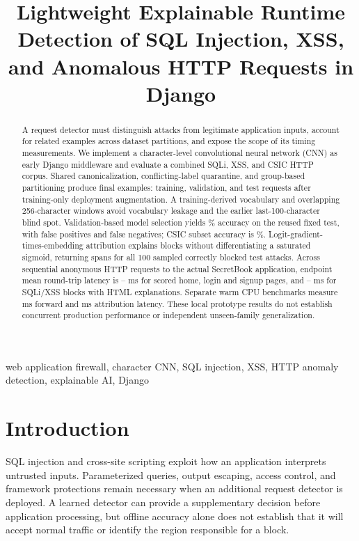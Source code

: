 \documentclass[conference]{IEEEtran}
\title{Lightweight Explainable Runtime Detection of SQL Injection, XSS, and Anomalous HTTP Requests in Django}
\author{\IEEEauthorblockN{Divyanth Dayasankar.P, Rohit Michael Raj}
\IEEEauthorblockA{\textit{Department of Computer Science}\\\textit{VIT Chennai}\\Chennai, India}}
\begin{document}
\maketitle
\begin{abstract}
A request detector must distinguish attacks from legitimate application inputs, account for related examples across dataset partitions, and expose the scope of its timing measurements. We implement a character-level convolutional neural network (CNN) as early Django middleware and evaluate a combined SQLi, XSS, and CSIC HTTP corpus. Shared canonicalization, conflicting-label quarantine, and group-based partitioning produce \FinalN{} final examples: \TrainN{} training, \ValN{} validation, and \TestN{} test requests after training-only deployment augmentation. A training-derived vocabulary and overlapping 256-character windows avoid vocabulary leakage and the earlier last-100-character blind spot. Validation-based model selection yields \TestAccuracy{}\% accuracy on the reused fixed test, with \FalsePositives{} false positives and \FalseNegatives{} false negatives; CSIC subset accuracy is \CsicAccuracy{}\%. Logit-gradient-times-embedding attribution explains blocks without differentiating a saturated sigmoid, returning spans for all 100 sampled correctly blocked test attacks. Across \SecretBookRequests{} sequential anonymous HTTP requests to the actual SecretBook application, endpoint mean round-trip latency is \SecretBookPageMin{}--\SecretBookPageMax{} ms for scored home, login and signup pages, and \SecretBookBlockMin{}--\SecretBookBlockMax{} ms for SQLi/XSS blocks with HTML explanations. Separate warm CPU benchmarks measure \ForwardMean{} ms forward and \XaiMean{} ms attribution latency. These local prototype results do not establish concurrent production performance or independent unseen-family generalization.
\end{abstract}
\begin{IEEEkeywords}
web application firewall, character CNN, SQL injection, XSS, HTTP anomaly detection, explainable AI, Django
\end{IEEEkeywords}

\section{Introduction}
SQL injection and cross-site scripting exploit how an application interprets untrusted inputs. Parameterized queries, output escaping, access control, and framework protections remain necessary when an additional request detector is deployed. A learned detector can provide a supplementary decision before application processing, but offline accuracy alone does not establish that it will accept normal traffic or identify the region responsible for a block.
\end{document}
